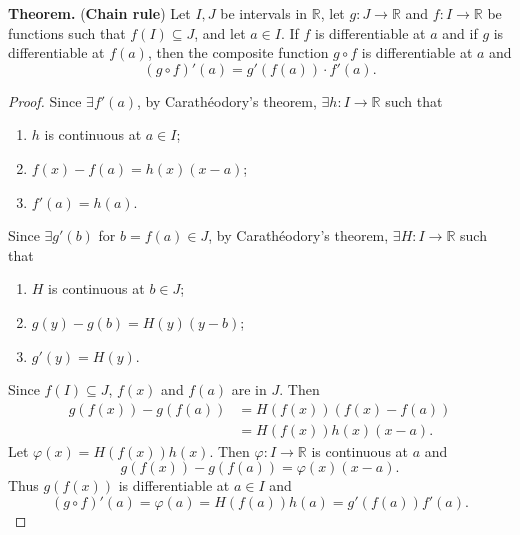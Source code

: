 \documentclass[12pt,a4paper]{article}
\begin{document}
\begin{tcolorbox}[colback=white]
	\textbf{Theorem.} (\textbf{Chain rule}) Let $I,J$ be intervals in $\mathbb{R}$, let $g:J\to\mathbb{R}$ and $f:I\to\mathbb{R}$ be functions such that $f(I)\subseteq J$, and let $a\in I$. If $f$ is differentiable at $a$ and if $g$ is differentiable at $f(a)$, then the composite function $g\circ f$ is differentiable at $a$ and \[
	(g\circ f)'(a)=g'(f(a))\cdot f'(a).
	\]\tcblower\begin{proof}
		Since $\exists f'(a)$, by Carath\'eodory's theorem, $\exists h:I\to\mathbb{R}$ such that \begin{enumerate}[($i$)]
			\item $h$ is continuous at $a\in I$;
			\item $f(x)-f(a)=h(x)(x-a)$;
			\item $f'(a)=h(a)$.
		\end{enumerate} 
		Since $\exists g'(b)$ for $b=f(a)\in J$, by Carath\'eodory's theorem, $\exists H:I\to\mathbb{R}$ such that \begin{enumerate}[($i$)]
			\item $H$ is continuous at $b\in J$;
			\item $g(y)-g(b)=H(y)(y-b)$;
			\item $g'(y)=H(y)$.
		\end{enumerate} Since $f(I)\subseteq J$, $f(x)$ and $f(a)$ are in $J$. Then \begin{align*}
		g(f(x))-g(f(a))&=H(f(x))(f(x)-f(a)) \\
		&=H(f(x))h(x)(x-a).
	\end{align*} Let $\varphi(x)=H(f(x))h(x)$. Then $\varphi:I\to\mathbb{R}$ is continuous at $a$ and \[
	g(f(x))-g(f(a)) = \varphi(x)(x-a).
	\] Thus $g(f(x))$ is differentiable at $a\in I$ and \[
	(g\circ f)'(a)=\varphi(a)=H(f(a))h(a)=g'(f(a))f'(a).
	\]
	\end{proof}
\end{tcolorbox}
\
\end{document}
